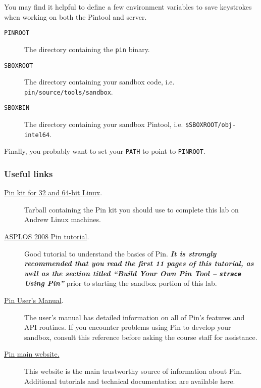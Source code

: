 \documentclass[11pt]{article}
\begin{document}
You may find it helpful to define a few environment variables to save keystrokes when working on both the Pintool and server.
\begin{description}
\item[\texttt{PINROOT}] The directory containing the \verb'pin' binary.
\item[\texttt{SBOXROOT}] The directory containing your sandbox code, i.e. \verb'pin/source/tools/sandbox'.
\item[\texttt{SBOXBIN}] The directory containing your sandbox Pintool, i.e. \verb'$SBOXROOT/obj-intel64'.
\end{description}
Finally, you probably want to set your \verb'PATH' to point to \verb'PINROOT'.

\subsubsection*{Useful links}
\begin{description}
\item[\href{https://software.intel.com/content/www/us/en/develop/articles/pin-a-binary-instrumentation-tool-downloads.html}{Pin kit for 32 and 64-bit Linux}.] Tarball containing the Pin kit you should use to complete this lab on Andrew Linux machines.

\item[\href{https://software.intel.com/content/dam/develop/external/us/en/documents/asplos2008-handson-256675.pdf}{ASPLOS 2008 Pin tutorial}.] Good tutorial to understand the basics of Pin. \textbf{\emph{It is strongly recommended that you read the first 11 pages of this tutorial, as well as the section titled ``Build Your Own Pin Tool -- \texttt{strace} Using Pin''}} prior to starting the sandbox portion of this lab.

\item[\href{https://software.intel.com/sites/landingpage/pintool/docs/98437/Pin/html/}{Pin User's Manual}.] The user's manual has detailed information on all of Pin's features and API routines. If you encounter problems using Pin to develop your sandbox, consult this reference before asking the course staff for assistance.

\item[\href{https://software.intel.com/content/www/us/en/develop/articles/pin-a-dynamic-binary-instrumentation-tool.html}{Pin main website.}] This website is the main trustworthy source of information about Pin. Additional tutorials and technical documentation are available here.
\end{description}
\end{document}
